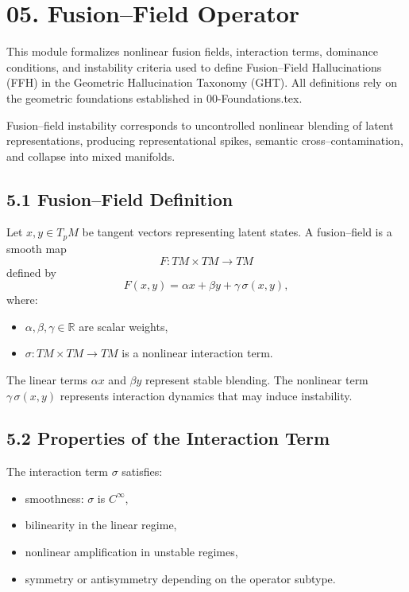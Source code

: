 
\section*{05. Fusion–Field Operator}

This module formalizes nonlinear fusion fields, interaction terms,
dominance conditions, and instability criteria used to define
Fusion–Field Hallucinations (FFH) in the Geometric Hallucination
Taxonomy (GHT). All definitions rely on the geometric foundations
established in 00-Foundations.tex.

Fusion–field instability corresponds to uncontrolled nonlinear blending
of latent representations, producing representational spikes, semantic
cross–contamination, and collapse into mixed manifolds.

\subsection*{5.1 Fusion–Field Definition}

Let $x, y \in T_p M$ be tangent vectors representing latent states.
A fusion–field is a smooth map
\[
F : TM \times TM \to TM
\]
defined by
\[
F(x,y)
= \alpha x + \beta y + \gamma \, \sigma(x,y),
\]
where:
\begin{itemize}
\item $\alpha, \beta, \gamma \in \mathbb{R}$ are scalar weights,
\item $\sigma : TM \times TM \to TM$ is a nonlinear interaction term.
\end{itemize}

The linear terms $\alpha x$ and $\beta y$ represent stable blending.
The nonlinear term $\gamma \, \sigma(x,y)$ represents interaction
dynamics that may induce instability.

\subsection*{5.2 Properties of the Interaction Term}

The interaction term $\sigma$ satisfies:
\begin{itemize}
\item smoothness: $\sigma$ is $C^\infty$,
\item bilinearity in the linear regime,
\item nonlinear amplification in unstable regimes,
\item symmetry or antisymmetry depending on the operator subtype.
\end{itemize}

